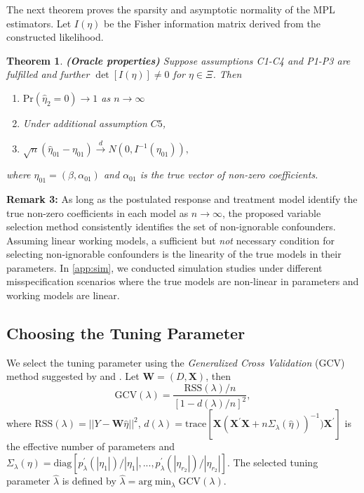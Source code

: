 \documentclass[11pt]{statsoc}
\newtheorem{theorem}{Theorem}
\begin{document}
The next theorem proves the sparsity and asymptotic normality of  the MPL estimators. Let $I(\eta)$
be the Fisher information matrix derived from the constructed likelihood.

\medskip
\begin{theorem} \textbf{(Oracle properties)}
Suppose assumptions C1-C4 and P1-P3 are fulfilled and further $\det [I(\eta)] \neq 0$ for $\eta \in \Xi$. Then
\begin{enumerate}
\item[(a)] ${\text{Pr}}(\widehat \eta_2=0)\rightarrow 1$ as $n\rightarrow \infty$
\item[] Under additional assumption  $C5$, 
\label{th:norm}
\item[(b)] $\sqrt n(\widehat \eta_{01}- \eta_{01}) {\stackrel{d}{\longrightarrow}} N(0,I^{-1}(\eta_{01})),$
\end{enumerate}
where $\eta_{01}=(\beta,\alpha_{01})$ and $\alpha_{01}$ is the true vector of
non-zero coefficients.
\end{theorem}

 \noindent \textbf{Remark 3:}  As long as the postulated response and treatment model identify the true non-zero coefficients in each model as $n \rightarrow \infty$, the proposed variable selection method consistently identifies the set of non-ignorable confounders. Assuming linear working models, a sufficient but {\it{not}} necessary condition for selecting non-ignorable confounders is the linearity of the true models in their parameters. In \ref{app:sim}, we conducted simulation studies under different misspecification scenarios where the true models are non-linear in parameters and working models are linear. 

\subsection{Choosing the Tuning Parameter} \label{tuning parameter}

We select the tuning parameter using the {\it Generalized Cross Validation}
(GCV) method suggested by \cite{tibshirani1996regression} and
\cite{fan2001variable}. Let ${\bm{W}}=(D,{\bm{X}})$, then
\[
\text{GCV}(\lambda)=\frac{ \text{RSS}(\lambda)/n}{[1-d(\lambda)/n]^2},
\]
where $\text{RSS}(\lambda)=||Y-{\bm{W}} \widehat \eta||^2$, $d(\lambda) =
\text{trace} [{\bm{X}}({\bm{X}}^{\prime} {\bm{X}} + n\Sigma_{\lambda}(\widehat
\eta))^{-1}){\bm{X}}^{\prime}]$ is the effective number of parameters and
$\Sigma_{\lambda}( \eta) =
\text{diag}[p^\prime_{\lambda}(|\eta_1|)/|\eta_1|,...,p^\prime_{\lambda}(|\eta_{r_2}|)/|\eta_{r_2}|]$.   The selected tuning parameter $\widehat \lambda$ is defined by $\widehat
\lambda= \text{arg}\min_{\lambda} \text{GCV}(\lambda)$.
\end{document}
